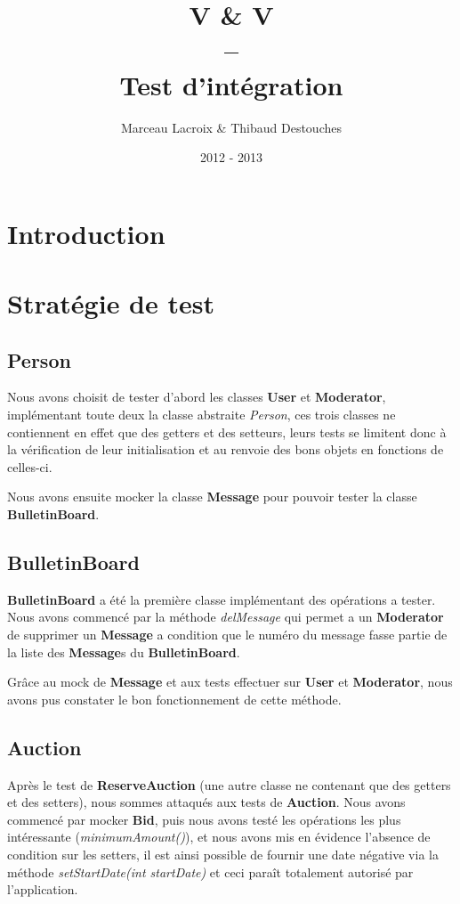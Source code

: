 \documentclass{article}
\title{V \& V
\\
--
\\
Test d'intégration}
\author{Marceau Lacroix \& Thibaud Destouches}
\date{2012 - 2013}
\begin{document}
\begin{titlepage}
\maketitle
\end{titlepage}

\newpage
\section*{Introduction}

\newpage
\section{Stratégie de test}

\subsection{Person}
Nous avons choisit de tester d'abord les classes \textbf{User} et \textbf{Moderator}, implémentant toute deux la classe abstraite \textit{Person}, ces trois classes ne contiennent en effet que des getters et des setteurs, leurs tests se limitent donc à la vérification de leur initialisation et au renvoie des bons objets en fonctions de celles-ci.

Nous avons ensuite mocker la classe \textbf{Message} pour pouvoir tester la classe \textbf{BulletinBoard}.

\subsection{BulletinBoard}
\textbf{BulletinBoard} a été la première classe implémentant des opérations a tester. Nous avons commencé par la méthode \textit{delMessage} qui permet a un \textbf{Moderator} de supprimer un \textbf{Message} a condition que le numéro du message fasse partie de la liste des \textbf{Message}s du \textbf{BulletinBoard}.

Grâce au mock de \textbf{Message} et aux tests effectuer sur \textbf{User} et \textbf{Moderator}, nous avons pus constater le bon fonctionnement de cette méthode.

\subsection{Auction}
Après le test de \textbf{ReserveAuction} (une autre classe ne contenant que des getters et des setters), nous sommes attaqués aux tests de \textbf{Auction}. Nous avons commencé par mocker \textbf{Bid}, puis nous avons testé les opérations les plus intéressante (\textit{minimumAmount()}), et nous avons mis en évidence l'absence de condition sur les setters, il est ainsi possible de fournir une date négative via la méthode \textit{setStartDate(int startDate)} et ceci paraît totalement autorisé par l'application.
\end{document}
